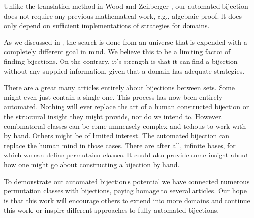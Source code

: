 Unlike the translation method in Wood and Zeilberger \cite{wood_zeilberger}, our automated bijection does not require any previous mathematical work, e.g., algebraic proof. It does only depend on sufficient implementations of strategies for domains.

As we discussed in , the search is done from an universe that is expended with a completely different goal in mind. We believe this to be a limiting factor of finding bijections. On the contrary, it's strength is that it can find a bijection without any supplied information, given that a domain has adequate strategies.

There are a great many articles entirely about bijections between sets. Some might even just contain a single one. This process has now been entirely automated. Nothing will ever replace the art of a human constructed bijection or the structural insight they might provide, nor do we intend to. However, combinatorial classes can be come immensely complex and tedious to work with by hand. Others might be of limited interest. The automated bijection can replace the human mind in those cases. There are after all, infinite bases, for which we can define permutaion classes. It could also provide some insight about how one might go about constructing a bijection by hand.

To demonstrate our automated bijection's potential we have connected numerous permutation classes with bijections, paying homage to several articles. Our hope is that this work will encourage others to extend \css{} into more domains and continue this work, or inspire different approaches to fully automated bijections.